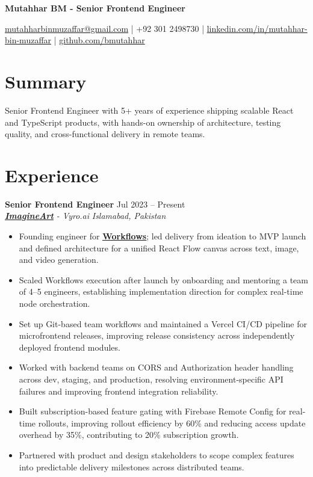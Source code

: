 \documentclass[9pt,letterpaper]{article}
\newcommand{\resumeHeader}[1]{%
  \begin{center}
    \vspace{0pt}
    {\fontsize{18pt}{20pt}\selectfont\bfseries #1\par}
    \vspace{0pt}
  \end{center}
}
\newcommand{\role}[4]{\textbf{#1} \hfill #2 \\
\textit{#3} \hfill \textit{#4}\\[-5pt]}
\begin{document}
\resumeHeader{Mutahhar BM - Senior Frontend Engineer}
\begin{center}
\fontsize{9pt}{10pt}\selectfont
\href{mailto:mutahharbinmuzaffar@gmail.com}{mutahharbinmuzaffar@gmail.com} \;|\; +92 301 2498730 \;|\;
\href{https://www.linkedin.com/in/mutahhar-bin-muzaffar}{linkedin.com/in/mutahhar-bin-muzaffar} \;|\;
\href{https://github.com/bmutahhar}{github.com/bmutahhar}
\end{center}

\section*{Summary}
Senior Frontend Engineer with 5+ years of experience shipping scalable React and TypeScript products, with hands-on ownership of architecture, testing quality, and cross-functional delivery in remote teams.

\section*{Experience}
\role{Senior Frontend Engineer}{Jul 2023 -- Present}{\href{https://www.imagine.art/}{\textbf{\underline{ImagineArt}}} - Vyro.ai}{Islamabad, Pakistan}
\begin{itemize}[leftmargin=*, itemsep=0pt, topsep=0pt, partopsep=0pt, parsep=0pt, after=\vspace{1pt}]
  \item Founding engineer for \href{https://www.imagine.art/flow}{\textbf{\underline{Workflows}}}; led delivery from ideation to MVP launch and defined architecture for a unified React Flow canvas across text, image, and video generation.
  \item Scaled Workflows execution after launch by onboarding and mentoring a team of 4--5 engineers, establishing implementation direction for complex real-time node orchestration.
  \item Set up Git-based team workflows and maintained a Vercel CI/CD pipeline for microfrontend releases, improving release consistency across independently deployed frontend modules.
  \item Worked with backend teams on CORS and Authorization header handling across dev, staging, and production, resolving environment-specific API failures and improving frontend integration reliability.
  \item Built subscription-based feature gating with Firebase Remote Config for real-time rollouts, improving rollout efficiency by 60\% and reducing access update overhead by 35\%, contributing to 20\% subscription growth.
  \item Partnered with product and design stakeholders to scope complex features into predictable delivery milestones across distributed teams.
\end{itemize}
\end{document}

